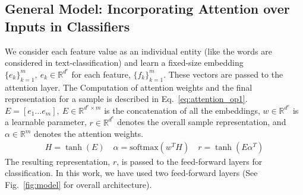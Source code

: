 \subsection{General Model: Incorporating Attention over Inputs in Classifiers}

We consider each feature value as an individual entity (like the words are considered in text-classification) and learn a fixed-size embedding $\{e_k\}_{k=1}^m,\ e_k \in \mathbb{R}^{d^e}$ for each feature, $\{f_k\}_{k=1}^m$. These vectors are passed to the attention layer. The Computation of  attention weights and the final representation for a sample is described in Eq.~\ref{eq:attention_op1}.  $E = [e_1 \ldots e_m], \ E \in \mathbb R ^{d^e\times m}  $ is the concatenation of all the embeddings, $w \in  \mathbb{R}^{d^e} $ is a learnable parameter, $r  \in \mathbb{R}^{d^e}$ denotes the overall sample representation, and  $\alpha \in \mathbb{R}^{m}$ denotes the attention weights.
% 
% 
\begin{align}
H        = \tanh(E)  \quad \label{eq:attention_op1}
\alpha   = \text{softmax}(w^TH) \quad
r        = \tanh(E\alpha^T)
\end{align}
% 
The resulting representation, $r$, is passed to the feed-forward layers for classification. In this work, we have used 
two feed-forward layers (See Fig.~\ref{fig:model} for overall architecture).

